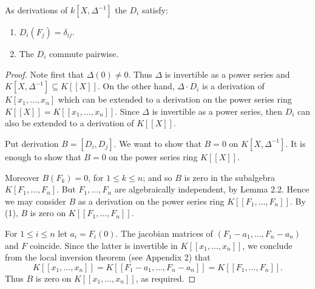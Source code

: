 \documentclass[12pt, oneside]{book}
\begin{document}
\begin{lemma}
    As derivations of $k\left[X, \Delta^{-1}\right]$ the $D_i$ satisfy:
    \begin{enumerate}
        \item
              $D_i\left(F_j\right)=\delta_{i j}$.
        \item
              The $D_i$ commute pairwise.
    \end{enumerate}
    \begin{proof}
        Note first that $\Delta(0) \neq 0$. Thus $\Delta$ is invertible as a power series and $K\left[X, \Delta^{-1}\right] \subseteq K[[X]]$. On the other hand, $\Delta \cdot D_i$ is a derivation of $K\left[x_1, \ldots, x_n\right]$ which can be extended to a derivation on the power series ring $K[[X]]=K\left[\left[x_1, \ldots, x_n\right]\right]$.
        Since $\Delta$ is invertible as a power series, then $D_i$ can also be extended to a derivation of $K[[X]]$.

        Put derivation $B=\left[D_i, D_j\right]$.
        We want to show that $B=0$ on $K\left[X, \Delta^{-1}\right]$. It is enough to show that $B=0$ on the power series ring $K[[X]]$.

        Moreover $B\left(F_k\right)=0$, for $1 \leq k \leq n$; and so $B$ is zero in the subalgebra $K\left[F_1, \ldots, F_n\right]$. But $F_1, \ldots, F_n$ are algebraically independent, by Lemma 2.2. Hence we may consider $B$ as a derivation on the power series ring $K\left[\left[F_1, \ldots, F_n\right]\right]$. By (1), $B$ is zero on $K\left[\left[F_1, \ldots, F_n\right]\right]$.

        For $1 \leq i \leq n$ let $a_i=F_i(0)$. The jacobian matrices of $\left(F_1-a_1, \ldots, F_n-a_n\right)$ and $F$ coincide. Since the latter is invertible in $K\left[\left[x_1, \ldots, x_n\right]\right]$, we conclude from the local inversion theorem (see Appendix 2) that
        \begin{equation*}
            K\left[\left[x_1, \ldots, x_n\right]\right]=K\left[\left[F_1-a_1, \ldots, F_n-a_n\right]\right]=K\left[\left[F_1, \ldots, F_n\right]\right] .
        \end{equation*}
        Thus $B$ is zero on $K\left[\left[x_1, \ldots, x_n\right]\right]$, as required.
    \end{proof}
\end{lemma}
\end{document}

